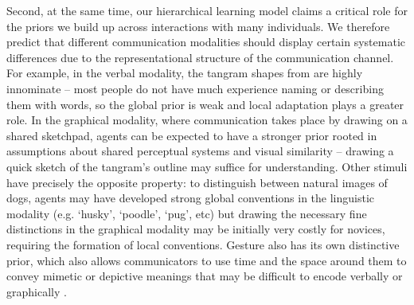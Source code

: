 Second, at the same time, our hierarchical learning model claims a critical role for the priors we build up across interactions with many individuals.
We therefore predict that different communication modalities should display certain systematic differences due to the representational structure of the communication channel.
For example, in the verbal modality, the tangram shapes from \cite{ClarkWilkesGibbs86_ReferringCollaborative} are highly innominate -- most people do not have much experience naming or describing them with words, so the global prior is weak and local adaptation plays a greater role.
In the graphical modality, where communication takes place by drawing on a shared sketchpad, agents can be expected to have a stronger prior rooted in assumptions about shared perceptual systems and visual similarity \cite{fan2018common} -- drawing a quick sketch of the tangram's outline may suffice for understanding.
Other stimuli have precisely the opposite property: to distinguish between natural images of dogs, agents may have developed strong global conventions in the linguistic modality (e.g. `husky', `poodle', `pug', etc) but drawing the necessary fine distinctions in the graphical modality may be initially very costly for novices, requiring the formation of local conventions. 
Gesture also has its own distinctive prior, which also allows communicators to use time and the space around them to convey mimetic or depictive meanings that may be difficult to encode verbally or graphically \cite{goldin-meadow_role_1999,clark2016depicting,mcneill1992hand}. 


